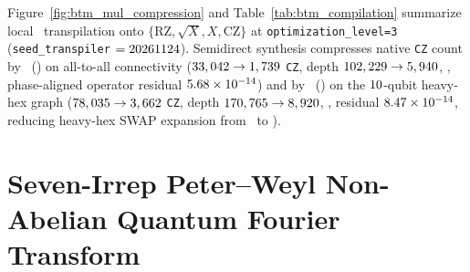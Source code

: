 \documentclass[aps,prx,twocolumn,superscriptaddress,nofootinbib]{revtex4-2}
\begin{document}
Figure~\ref{fig:btm_mul_compression} and Table~\ref{tab:btm_compilation} summarize local \btmProxyTier\ transpilation onto $\{\mathrm{RZ},\sqrt{X},X,\mathrm{CZ}\}$ at \texttt{optimization\_level=3} (\texttt{seed\_transpiler} $= 20261124$). Semidirect synthesis compresses native \texttt{CZ} count by \btmMulAtaCzRatio\ (\btmMulAtaCzRatioFour) on all-to-all connectivity ($33,042 \to 1,739$ \texttt{CZ}, depth $102,229 \to 5,940$, \btmMulAtaDepthRatio, phase-aligned operator residual $5.68 \times 10^{-14}$) and by \btmMulHhCzRatio\ (\btmMulHhCzRatioFour) on the $10$-qubit heavy-hex graph ($78,035 \to 3,662$ \texttt{CZ}, depth $170,765 \to 8,920$, \btmMulHhDepthRatio, residual $8.47 \times 10^{-14}$, reducing heavy-hex SWAP expansion from \btmMulHhSwapOverheadGen\ to \btmMulHhSwapOverheadStruct).

\section{Seven-Irrep Peter--Weyl Non-Abelian Quantum Fourier Transform}
\end{document}
